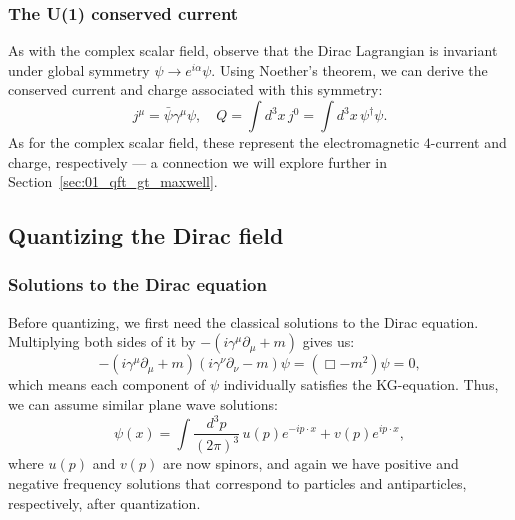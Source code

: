 \subsubsection{The U(1) conserved current}

As with the complex scalar field, observe that the Dirac Lagrangian is invariant under global \UU[1] symmetry $\psi \rightarrow e^{i\alpha}\psi$.
Using Noether's theorem, we can derive the conserved current and charge associated with this symmetry:
\begin{equation}
	\label{eq:01_qft_spinors_lagrangian_current}
	j^\mu = \bar\psi\gamma^\mu\psi, \quad Q = \int d^3x\, j^0 = \int d^3x\, \psi^\dagger\psi.
\end{equation}
As for the complex scalar field, these represent the electromagnetic $4$-current and charge, respectively --- a connection we will explore further in Section~\ref{sec:01_qft_gt_maxwell}.


\subsection{Quantizing the Dirac field}
\label{sec:01_qft_spinors_quantization}

\subsubsection{Solutions to the Dirac equation}

Before quantizing, we first need the classical solutions to the Dirac equation.
Multiplying both sides of it by $-(i\gamma^\mu\partial_\mu + m)$ gives us:
\begin{equation}
	\label{eq:01_qft_spinors_dirac_squared}
	-(i\gamma^\mu\partial_\mu + m)(i\gamma^\nu\partial_\nu - m)\psi = (\Box - m^2)\psi = 0,
\end{equation}
which means each component of $\psi$ individually satisfies the KG-equation.
Thus, we can assume similar plane wave solutions:
\begin{equation}
	\label{eq:01_qft_spinors_dirac_solution}
	\psi(x) = \int \frac{d^3p}{(2\pi)^3} \, u(p) e^{-ip\cdot x} + v(p) e^{ip\cdot x},
\end{equation}
where $u(p)$ and $v(p)$ are now spinors, and again we have positive and negative frequency solutions that correspond to particles and antiparticles, respectively, after quantization.


